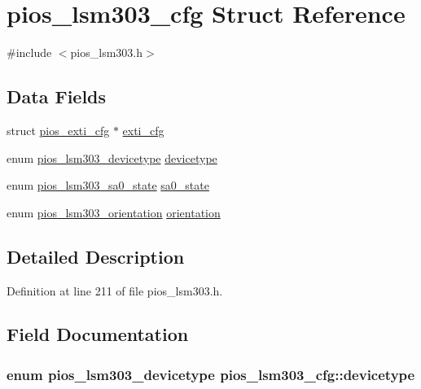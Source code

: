 \hypertarget{structpios__lsm303__cfg}{\section{pios\-\_\-lsm303\-\_\-cfg Struct Reference}
\label{structpios__lsm303__cfg}
}


{\ttfamily \#include $<$pios\-\_\-lsm303.\-h$>$}

\subsection*{Data Fields}
\begin{DoxyCompactItemize}
\item 
struct \hyperlink{structpios__exti__cfg}{pios\-\_\-exti\-\_\-cfg} $\ast$ \hyperlink{structpios__lsm303__cfg_a90c0ca7937453279f276d8adc5b7e82c}{exti\-\_\-cfg}
\item 
enum \hyperlink{group___p_i_o_s___l_s_m303_ga2657cfa22c98bd2d84ea7fed74fac52a}{pios\-\_\-lsm303\-\_\-devicetype} \hyperlink{structpios__lsm303__cfg_a5b16505db880f6b6b0c22b4dedb532bf}{devicetype}
\item 
enum \hyperlink{group___p_i_o_s___l_s_m303_ga73dd8a4c7039b8b41b78b88b16c510d6}{pios\-\_\-lsm303\-\_\-sa0\-\_\-state} \hyperlink{structpios__lsm303__cfg_a14bcbef91027a231f863b4629c9cdc74}{sa0\-\_\-state}
\item 
enum \hyperlink{group___p_i_o_s___l_s_m303_gaf21acd6da6d1a83963ba1b7a45937cfc}{pios\-\_\-lsm303\-\_\-orientation} \hyperlink{structpios__lsm303__cfg_a53a64d5c1d513bda3033f35b41a5afcc}{orientation}
\end{DoxyCompactItemize}


\subsection{Detailed Description}


Definition at line 211 of file pios\-\_\-lsm303.\-h.



\subsection{Field Documentation}
\hypertarget{structpios__lsm303__cfg_a5b16505db880f6b6b0c22b4dedb532bf}{
\subsubsection[{devicetype}]{\setlength{\rightskip}{0pt plus 5cm}enum {\bf pios\-\_\-lsm303\-\_\-devicetype} pios\-\_\-lsm303\-\_\-cfg\-::devicetype}}\label{structpios__lsm303__cfg_a5b16505db880f6b6b0c22b4dedb532bf}


